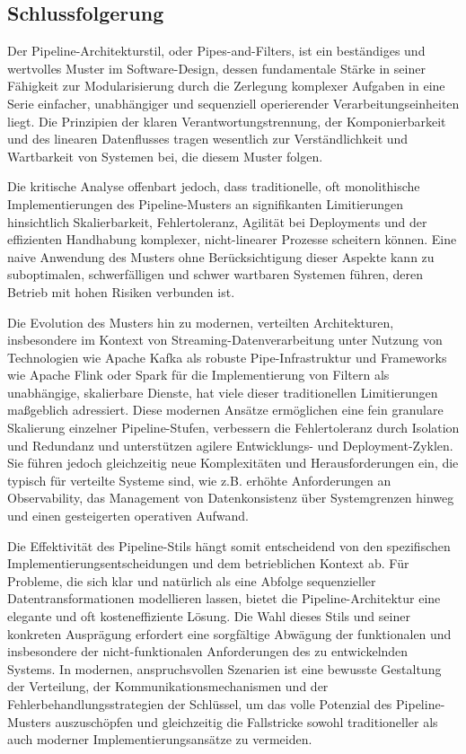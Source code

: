 \documentclass[10pt]{article}
\begin{document}
\begin{multicols}{2}
\section{Schlussfolgerung}
Der Pipeline-Architekturstil, oder Pipes-and-Filters, ist ein beständiges und wertvolles Muster im Software-Design, dessen fundamentale Stärke in seiner Fähigkeit zur Modularisierung durch die Zerlegung komplexer Aufgaben in eine Serie einfacher, unabhängiger und sequenziell operierender Verarbeitungseinheiten liegt. Die Prinzipien der klaren Verantwortungstrennung, der Komponierbarkeit und des linearen Datenflusses tragen wesentlich zur Verständlichkeit und Wartbarkeit von Systemen bei, die diesem Muster folgen.

Die kritische Analyse offenbart jedoch, dass traditionelle, oft monolithische Implementierungen des Pipeline-Musters an signifikanten Limitierungen hinsichtlich Skalierbarkeit, Fehlertoleranz, Agilität bei Deployments und der effizienten Handhabung komplexer, nicht-linearer Prozesse scheitern können. Eine naive Anwendung des Musters ohne Berücksichtigung dieser Aspekte kann zu suboptimalen, schwerfälligen und schwer wartbaren Systemen führen, deren Betrieb mit hohen Risiken verbunden ist.

Die Evolution des Musters hin zu modernen, verteilten Architekturen, insbesondere im Kontext von Streaming-Datenverarbeitung unter Nutzung von Technologien wie Apache Kafka als robuste Pipe-Infrastruktur und Frameworks wie Apache Flink oder Spark für die Implementierung von Filtern als unabhängige, skalierbare Dienste, hat viele dieser traditionellen Limitierungen maßgeblich adressiert. Diese modernen Ansätze ermöglichen eine fein granulare Skalierung einzelner Pipeline-Stufen, verbessern die Fehlertoleranz durch Isolation und Redundanz und unterstützen agilere Entwicklungs- und Deployment-Zyklen. Sie führen jedoch gleichzeitig neue Komplexitäten und Herausforderungen ein, die typisch für verteilte Systeme sind, wie z.B. erhöhte Anforderungen an Observability, das Management von Datenkonsistenz über Systemgrenzen hinweg und einen gesteigerten operativen Aufwand.

Die Effektivität des Pipeline-Stils hängt somit entscheidend von den spezifischen Implementierungsentscheidungen und dem betrieblichen Kontext ab. Für Probleme, die sich klar und natürlich als eine Abfolge sequenzieller Datentransformationen modellieren lassen, bietet die Pipeline-Architektur eine elegante und oft kosteneffiziente Lösung. Die Wahl dieses Stils und seiner konkreten Ausprägung erfordert eine sorgfältige Abwägung der funktionalen und insbesondere der nicht-funktionalen Anforderungen des zu entwickelnden Systems. In modernen, anspruchsvollen Szenarien ist eine bewusste Gestaltung der Verteilung, der Kommunikationsmechanismen und der Fehlerbehandlungsstrategien der Schlüssel, um das volle Potenzial des Pipeline-Musters auszuschöpfen und gleichzeitig die Fallstricke sowohl traditioneller als auch moderner Implementierungsansätze zu vermeiden.

\end{multicols}
\end{document}
